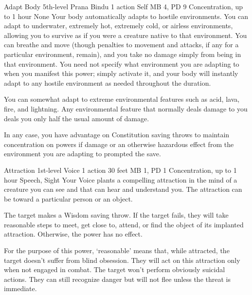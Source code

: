 \DndPowerHeader%
    {Adapt Body\label{pwr:adapt_body}}
    {5th-level Prana Bindu}
    {1 action}
    {Self}
    {MB 4, PD 9}
    {Concentration, up to 1 hour}
    {None}
Your body automatically adapts to hostile
environments. You can adapt to underwater, extremely hot,
extremely cold, or airless environments, allowing you to survive
as if you were a creature native to that environment. You
can breathe and move (though penalties to movement and attacks,
if any for a particular environment, remain), and you take
no damage simply from being in that environment. You need
not specify what environment you are adapting to when you
manifest this power; simply activate it, and your body will
instantly adapt to any hostile environment as needed throughout
the duration.

You can somewhat adapt to extreme environmental features such
as acid, lava, fire, and lightning. Any environmental feature
that normally deals damage to you deals
you only half the usual amount of damage.

In any case, you have advantage on Constitution saving throws
to maintain concentration on powers if damage or an otherwise
hazardous effect from the environment you are adapting to
prompted the save.

\DndPowerHeader%
    {Attraction\label{pwr:attraction}}
    {1st-level Voice}
    {1 action}
    {30 feet}
    {MB 1, PD 1}
    {Concentration, up to 1 hour}
    {Speech, Sight}
Your Voice plants a compelling attraction
in the mind of a creature you can see and that can hear
and understand you.
The attraction can be toward a particular person or an object.

The target makes a Wisdom saving throw. If the target fails,
they will take reasonable steps to meet, get close to, attend,
or find the object of its implanted attraction. Otherwise,
the power has no effect.

For the purpose of this power, `reasonable' means that, while
attracted, the target doesn't suffer from blind obsession.
They will act on this attraction only when not engaged in
combat. The target won't perform obviously suicidal actions.
They can still recognize danger but will not flee unless the
threat is immediate.

